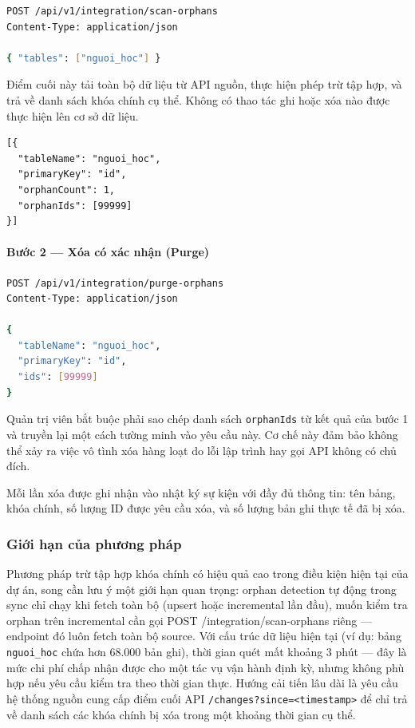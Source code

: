\begin{lstlisting}[language=bash, caption={API quét bản ghi mồ côi — chỉ đọc}]
POST /api/v1/integration/scan-orphans
Content-Type: application/json

{ "tables": ["nguoi_hoc"] }
\end{lstlisting}

Điểm cuối này tải toàn bộ dữ liệu từ API nguồn, thực hiện phép trừ tập hợp, và trả về danh sách khóa chính cụ thể. Không có thao tác ghi hoặc xóa nào được thực hiện lên cơ sở dữ liệu.

\begin{lstlisting}[caption={Cấu trúc phản hồi mẫu từ API scan-orphans}]
[{
  "tableName": "nguoi_hoc",
  "primaryKey": "id",
  "orphanCount": 1,
  "orphanIds": [99999]
}]
\end{lstlisting}

\paragraph{Bước 2 — Xóa có xác nhận (Purge)}

\begin{lstlisting}[language=bash, caption={API xóa bản ghi mồ côi — yêu cầu truyền ID tường minh}]
POST /api/v1/integration/purge-orphans
Content-Type: application/json

{
  "tableName": "nguoi_hoc",
  "primaryKey": "id",
  "ids": [99999]
}
\end{lstlisting}

Quản trị viên bắt buộc phải sao chép danh sách \texttt{orphanIds} từ kết quả của bước 1 và truyền lại một cách tường minh vào yêu cầu này. Cơ chế này đảm bảo không thể xảy ra việc vô tình xóa hàng loạt do lỗi lập trình hay gọi API không có chủ đích.

Mỗi lần xóa được ghi nhận vào nhật ký sự kiện với đầy đủ thông tin: tên bảng, khóa chính, số lượng ID được yêu cầu xóa, và số lượng bản ghi thực tế đã bị xóa.

\subsubsection{Giới hạn của phương pháp}

Phương pháp trừ tập hợp khóa chính có hiệu quả cao trong điều kiện hiện tại của dự án, song cần lưu ý một giới hạn quan trọng: orphan detection tự động trong sync chỉ chạy khi fetch toàn bộ (upsert hoặc incremental lần đầu), muốn kiểm tra orphan trên incremental cần gọi POST /integration/scan-orphans riêng — endpoint đó luôn fetch toàn bộ source.
Với cấu trúc dữ liệu hiện tại (ví dụ: bảng \texttt{nguoi\_hoc} chứa hơn 68.000 bản ghi), thời gian quét mất khoảng 3 phút — đây là mức chi phí chấp nhận được cho một tác vụ vận hành định kỳ, nhưng không phù hợp nếu yêu cầu kiểm tra theo thời gian thực. Hướng cải tiến lâu dài là yêu cầu hệ thống nguồn cung cấp điểm cuối API \texttt{/changes?since=<timestamp>} để chỉ trả về danh sách các khóa chính bị xóa trong một khoảng thời gian cụ thể.

